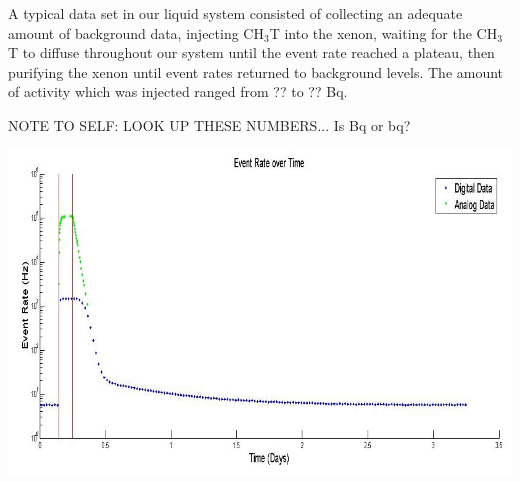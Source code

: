 \documentclass[a4paper,12pt]{article}
\begin{document}
A typical data set in our liquid system consisted of collecting an adequate amount of background data, injecting CH$_3$T into the xenon, waiting for the CH$_3$T to diffuse throughout our system until the event rate reached a plateau, then purifying the xenon until event rates returned to background levels.  The amount of activity which was injected ranged from ?? to ?? Bq.

NOTE TO SELF: LOOK UP THESE NUMBERS... Is Bq or bq?


\begin{center}
\includegraphics[scale=0.5]{PlasticPurEffTimeHisto2.jpg}
\end{center}
\end{document}
